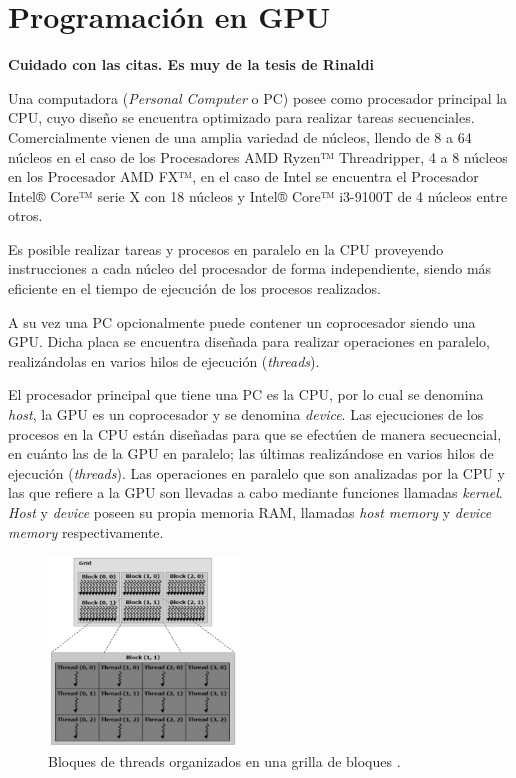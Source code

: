 \chapter{Programación en GPU}
\graphicspath{{figs/cap3/}}
\label{cap3}

\textbf{Cuidado con las citas. Es muy de la tesis de Rinaldi}


Una computadora (\textit{Personal Computer} o PC) posee como procesador principal la CPU, cuyo diseño se encuentra optimizado para realizar tareas secuenciales. Comercialmente vienen de una amplia variedad de núcleos, llendo de 8 a 64 núcleos en el caso de los Procesadores AMD Ryzen™ Threadripper, 4 a 8 núcleos en los Procesador AMD FX™, en el caso de Intel se encuentra el Procesador Intel® Core™ serie X con 18 núcleos y  Intel® Core™ i3-9100T de 4 núcleos entre otros. \cite{edp:2020:amd} \cite{icp:2020:intel}

Es posible realizar tareas y procesos en paralelo en la CPU proveyendo instrucciones a cada núcleo del procesador de forma independiente, siendo más eficiente en el tiempo de ejecución de los procesos realizados.

A su vez una PC opcionalmente puede contener un coprocesador siendo una GPU. Dicha placa se encuentra diseñada para realizar operaciones en paralelo, realizándolas en varios hilos de ejecución (\textit{threads}).




El procesador principal que tiene una PC es la CPU, por lo cual se denomina \textit{host}, la GPU es un coprocesador y se denomina \textit{device}. Las ejecuciones de los procesos en la CPU están diseñadas para que se efectúen de manera secuecncial, en cuánto las de la GPU en paralelo; las últimas realizándose en varios hilos de ejecución (\textit{threads}). Las operaciones en paralelo que son analizadas por la CPU y las que refiere a la GPU son llevadas a cabo mediante funciones llamadas \textit{kernel}. \textit{Host} y \textit{device} poseen su propia memoria RAM, llamadas \textit{host memory} y \textit{device memory} respectivamente. \cite{rinaldi2011modelos}

\begin{figure}[h!]
	\centering
	\includegraphics[width=0.45\textwidth]{figs/cap3/threads_block_grid.png}
	\caption{Bloques de threads organizados en una grilla de bloques \cite{rinaldi2011modelos}.}
	\label{fig:block_grid_threads}
\end{figure}

